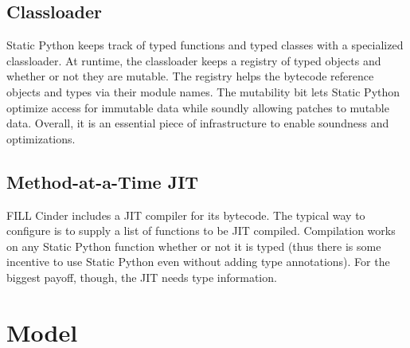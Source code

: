 \documentclass[english,cleveref,submission]{programming}
\newcommand{\SP}{Static Python}
\begin{document}
\subsection{Classloader}
\label{s:classloader}

\SP{} keeps track of typed functions and typed classes with a specialized classloader.
At runtime, the classloader keeps a registry of typed objects and whether or not they
are mutable.
The registry helps the bytecode reference objects and types via their module names.
The mutability bit lets \SP{} optimize access for immutable data while soundly allowing
patches to mutable data.
Overall, it is an essential piece of infrastructure to enable soundness and optimizations.


\subsection{Method-at-a-Time JIT}

FILL Cinder includes a JIT compiler for its bytecode.
The typical way to configure is to supply a list of functions to be JIT compiled.
Compilation works on any \SP{} function whether or not it is typed
(thus there is some incentive to use \SP{} even without adding type annotations).
For the biggest payoff, though, the JIT needs type information.



\section{Model}
\label{s:model}

\end{document}

